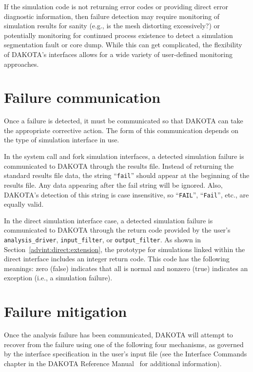 If the simulation code is not returning error codes or providing
direct error diagnostic information, then failure detection may
require monitoring of simulation results for sanity (e.g., is the mesh
distorting excessively?) or potentially monitoring for continued
process existence to detect a simulation segmentation fault or core
dump. While this can get complicated, the flexibility of DAKOTA's
interfaces allows for a wide variety of user-defined monitoring
approaches.

\section{Failure communication}\label{failure:communication}

Once a failure is detected, it must be communicated so that DAKOTA can
take the appropriate corrective action. The form of this communication
depends on the type of simulation interface in use.

In the system call and fork simulation interfaces, a detected
simulation failure is communicated to DAKOTA through the results file.
Instead of returning the standard results file data, the string
``\texttt{fail}'' should appear at the beginning of the results file.
Any data appearing after the fail string will be ignored. Also,
DAKOTA's detection of this string is case insensitive, so
``\texttt{FAIL}'', ``\texttt{Fail}'', etc., are equally valid.

In the direct simulation interface case, a detected simulation
failure is communicated to DAKOTA through the return code provided by
the user's \texttt{analysis\_driver},
\texttt{input\_filter}, or \texttt{output\_filter}. As shown in
Section~\ref{advint:direct:extension}, the prototype for simulations
linked within the direct interface includes an integer return code.
This code has the following meanings: zero (false) indicates that all
is normal and nonzero (true) indicates an exception (i.e., a
simulation failure).

\section{Failure mitigation}\label{failure:mitigation}

Once the analysis failure has been communicated, DAKOTA will attempt
to recover from the failure using one of the following four
mechanisms, as governed by the interface specification in the user's
input file (see the Interface Commands chapter in the DAKOTA Reference
Manual~\cite{RefMan} for additional information).

